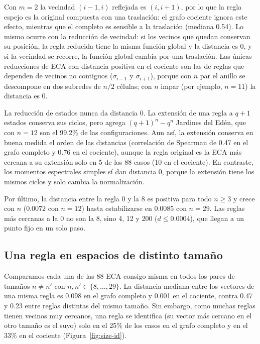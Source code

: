 Con $m = 2$ la vecindad $(i-1, i)$ reflejada es $(i, i+1)$, por lo que la regla espejo es la original compuesta con una traslación: el grafo cociente ignora este efecto, mientras que el completo es sensible a la traslación (mediana 0.54). Lo mismo ocurre con la reducción de vecindad: si los vecinos que quedan conservan su posición, la regla reducida tiene la misma función global y la distancia es 0, y si la vecindad se recorre, la función global cambia por una traslación. Las únicas reducciones de ECA con distancia positiva en el cociente son las de reglas que dependen de vecinos no contiguos ($\sigma_{i-1}$ y $\sigma_{i+1}$), porque con $n$ par el anillo se descompone en dos subredes de $n/2$ células; con $n$ impar (por ejemplo, $n = 11$) la distancia es 0.

La reducción de estados nunca da distancia 0. La extensión de una regla a $q + 1$ estados conserva sus ciclos, pero agrega $(q+1)^n - q^n$ Jardines del Edén, que con $n = 12$ son el 99.2\% de las configuraciones. Aun así, la extensión conserva en buena medida el orden de las distancias (correlación de Spearman de 0.47 en el grafo completo y 0.76 en el cociente), aunque la regla original es la ECA más cercana a su extensión solo en 5 de los 88 casos (10 en el cociente). En contraste, los momentos espectrales simples sí dan distancia 0, porque la extensión tiene los mismos ciclos y solo cambia la normalización.

Por último, la distancia entre la regla 0 y la 8 es positiva para todo $n \ge 3$ y crece con $n$ (0.0072 con $n = 12$) hasta estabilizarse en 0.0085 con $n = 29$. Las reglas más cercanas a la 0 no son la 8, sino 4, 12 y 200 ($d \le 0.0004$), que llegan a un punto fijo en un solo paso.

\subsection{Una regla en espacios de distinto tamaño}
\label{subsec:sizes}

Comparamos cada una de las 88 ECA consigo misma en todos los pares de tamaños $n \neq n'$ con $n, n' \in \{8, \dots, 29\}$. La distancia mediana entre los vectores de una misma regla es 0.098 en el grafo completo y 0.001 en el cociente, contra 0.47 y 0.23 entre reglas distintas del mismo tamaño. Sin embargo, como muchas reglas tienen vecinos muy cercanos, una regla se identifica (su vector más cercano en el otro tamaño es el suyo) solo en el 25\% de los casos en el grafo completo y en el 33\% en el cociente (Figura~\ref{fig:size-id}).

